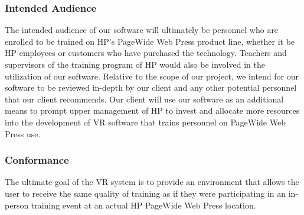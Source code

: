 \documentclass[onecolumn, draftclsnofoot,10pt, compsoc]{IEEEtran}
\begin{document}
\subsubsection{Intended Audience}
The intended audience of our software will ultimately be personnel who are enrolled to be trained on HP's PageWide Web Press product line, whether it be HP employees or customers who have purchased the technology. Teachers and supervisors of the training program of HP would also be involved in the utilization of our software. Relative to the scope of our project, we intend for our software to be reviewed in-depth by our client and any other potential personnel that our client recommends. Our client will use our software as an additional means to prompt upper management of HP to invest and allocate more resources into the development of VR software that trains personnel on PageWide Web Press use. 
\subsubsection{Conformance}
The ultimate goal of the VR system is to provide an environment that allows the user to receive the same quality of training as if they were participating in an in-person training event at an actual HP PageWide Web Press location.
\end{document}
